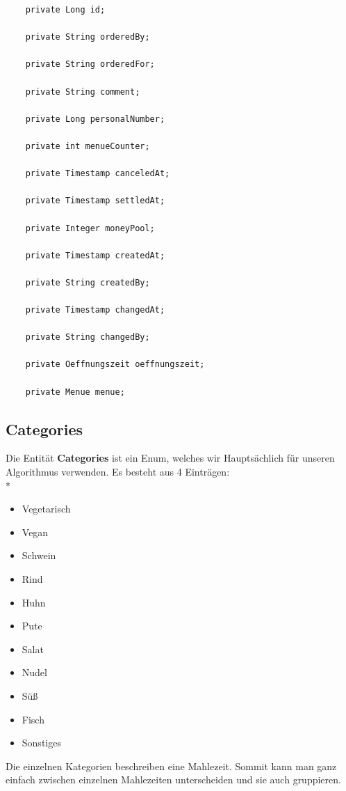 \begin{lstlisting}
    private Long id;

    private String orderedBy;

    private String orderedFor;

    private String comment;

    private Long personalNumber;

    private int menueCounter;

    private Timestamp canceledAt;

    private Timestamp settledAt;

    private Integer moneyPool;

    private Timestamp createdAt;

    private String createdBy;

    private Timestamp changedAt;

    private String changedBy;

    private Oeffnungszeit oeffnungszeit;

    private Menue menue;
\end{lstlisting}

\subsection{Categories}

Die Entität \textbf{Categories} ist ein Enum, welches wir Hauptsächlich für unseren Algorithmus verwenden. Es besteht aus 4 Einträgen: \\*


\begin{itemize}
    \item Vegetarisch
    \item Vegan
    \item Schwein
    \item Rind
    \item Huhn
    \item Pute
    \item Salat
    \item Nudel
    \item Süß
    \item Fisch
    \item Sonstiges
\end{itemize}

Die einzelnen Kategorien beschreiben eine Mahlezeit. Sommit kann man ganz einfach zwischen einzelnen Mahlezeiten unterscheiden und sie auch gruppieren.

